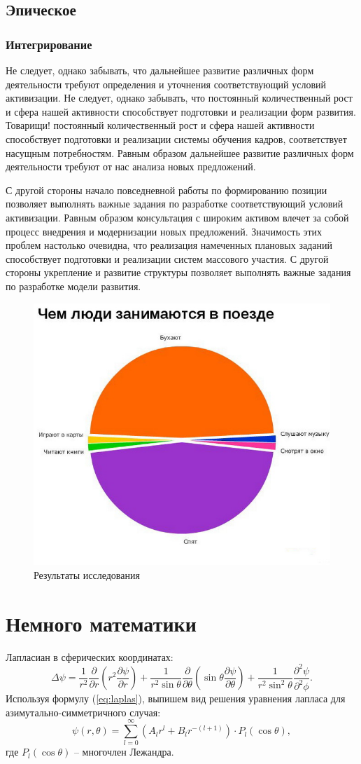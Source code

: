 \documentclass[titlepage]{hedsemwork}
\begin{document}
\subsection{Эпическое}
\subsubsection{Интегрирование}
Не следует, однако забывать, что дальнейшее развитие различных форм деятельности требуют определения и уточнения соответствующий условий активизации. Не следует, однако забывать, что постоянный количественный рост и сфера нашей активности способствует подготовки и реализации форм развития. Товарищи! постоянный количественный рост и сфера нашей активности способствует подготовки и реализации системы обучения кадров, соответствует насущным потребностям. Равным образом дальнейшее развитие различных форм деятельности требуют от нас анализа новых предложений.

С другой стороны начало повседневной работы по формированию позиции позволяет выполнять важные задания по разработке соответствующий условий активизации. Равным образом консультация с широким активом влечет за собой процесс внедрения и модернизации новых предложений. Значимость этих проблем настолько очевидна, что реализация намеченных плановых заданий способствует подготовки и реализации систем массового участия. С другой стороны укрепление и развитие структуры позволяет выполнять важные задания по разработке модели развития.
\begin{figure}[b]
    \center
    \includegraphics[width=.47\textwidth]{2.jpg}
    \caption{Результаты исследования}
\end{figure}

\section{Немного математики}
Лапласиан в сферических координатах:
\begin{equation}
    \Delta\psi = \frac{1}{r^2}\frac{\partial}{\partial r}
    \left( r^2 \frac{\partial \psi}{\partial r} \right) +
    \frac{1}{r^2\sin\theta}\frac{\partial}{\partial\theta}
    \left(\sin\theta\frac{\partial\psi}{\partial\theta}\right) +
    \frac{1}{r^2\sin^2\theta}\frac{\partial^2\psi}{\partial^2\phi}.
    \label{eq:laplas}
\end{equation}
Используя формулу (\ref{eq:laplas}), выпишем вид решения уравнения лапласа для
азимутально-симметричного случая:
\begin{equation}
    \psi(r,\theta) = \sum_{l=0}^\infty\left(A_lr^l + B_lr^{-(l+1)}\right)\cdot
    P_l(\cos\theta),
\end{equation}
где \(P_l(\cos\theta)\) -- многочлен Лежандра.
\end{document}
